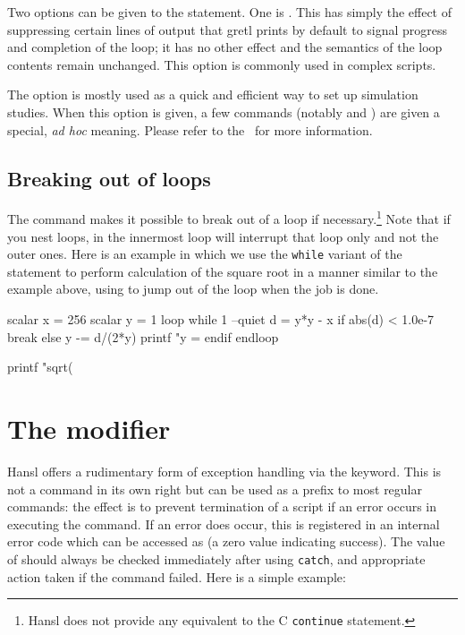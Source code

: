 Two options can be given to the  statement. One is
. This has simply the effect of suppressing certain
lines of output that gretl prints by default to signal progress and
completion of the loop; it has no other effect and the semantics of
the loop contents remain unchanged. This option is commonly used in
complex scripts.

The  option is mostly used as a quick and
efficient way to set up simulation studies. When this option is given,
a few commands (notably  and ) are given a
special, \emph{ad hoc} meaning. Please refer to the \GUG\ for more
information.
 
\subsection{Breaking out of loops}
\label{sec:loop-break}

The  command makes it possible to break out of a loop if
necessary.\footnote{Hansl does not provide any equivalent to the C
  \texttt{continue} statement.} Note that if you nest loops,
 in the innermost loop will interrupt that loop only and
not the outer ones.  Here is an example in which we use the
\texttt{while} variant of the  statement to perform
calculation of the square root in a manner similar to the example
above, using  to jump out of the loop when the job is done.
\begin{code}
scalar x = 256
scalar y = 1
loop while 1 --quiet
    d = y*y - x
    if abs(d) < 1.0e-7
        break
    else
        y -= d/(2*y)
        printf "y = %
    endif
endloop

printf "sqrt(%
\end{code}

\section{The  modifier}

Hansl offers a rudimentary form of exception handling via the
 keyword. This is not a command in its own right but can be
used as a prefix to most regular commands: the effect is to prevent
termination of a script if an error occurs in executing the
command. If an error does occur, this is registered in an internal
error code which can be accessed as  (a zero value
indicating success). The value of  should always be
checked immediately after using \texttt{catch}, and appropriate action
taken if the command failed. Here is a simple example:

